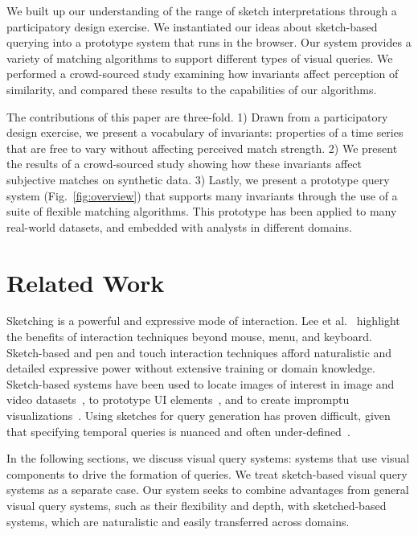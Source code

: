 We built up our understanding of the range of sketch interpretations through a participatory design exercise. We instantiated our ideas about sketch-based querying into a prototype system that runs in the browser.  Our system provides a variety of matching algorithms to support different types of visual queries. We performed a crowd-sourced study examining how invariants affect perception of similarity, and compared these results to the capabilities of our algorithms. 

The contributions of this paper are three-fold. 1) Drawn from a participatory design exercise, we present a vocabulary of invariants: properties of a time series that are free to vary without affecting perceived match strength. 2) We present the results of a crowd-sourced study showing how these invariants affect subjective matches on synthetic data. 3) Lastly, we present a prototype query system (Fig.~\ref{fig:overview}) that supports many invariants through the use of a suite of flexible matching algorithms. This prototype has been applied to many real-world datasets, and embedded with analysts in different domains. 

\section{Related Work}

Sketching is a powerful and expressive mode of interaction. Lee et al.~\cite{lee2012beyond} highlight the benefits of interaction techniques beyond mouse, menu, and keyboard. Sketch-based and pen and touch interaction techniques afford naturalistic and detailed expressive power without extensive training or domain knowledge. Sketch-based systems have been used to locate images of interest in image and video datasets~\cite{flickner1995query,kato1992sketch}, to prototype UI elements~\cite{landay2001sketching}, and to create impromptu visualizations~\cite{lee2013sketchstory}. Using sketches for query generation has proven difficult, given that specifying temporal queries is nuanced and often under-defined~\cite{monroe2012exploring}.

In the following sections, we discuss visual query systems: systems that use visual components to drive the formation of queries. We treat sketch-based visual query systems as a separate case. Our system seeks to combine advantages from general visual query systems, such as their flexibility and depth, with sketched-based systems, which are naturalistic and easily transferred across domains.


